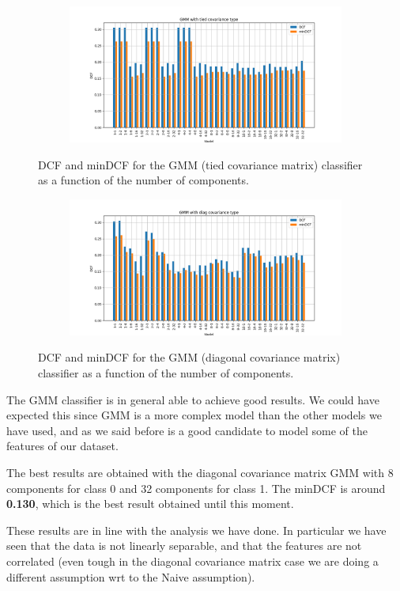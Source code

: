 \documentclass[12pt]{report}
\newcommand{\nnl}{%
    \newline
    \newline
}
\newcommand{\nl}{%
    \newline
    \noindent
}
\begin{document}
\begin{figure}[H]
    \centering
    \begin{subfigure}[t]{0.6\textwidth}
        \includegraphics[width=\textwidth]{./plot/GMM/gmm_tied.png}
    \end{subfigure}
    \caption{DCF and minDCF for the GMM (tied covariance matrix) classifier as a function of the number of components.}
    \label{fig:gmm_tied}
\end{figure}

\begin{figure}[H]
    \centering
    \begin{subfigure}[t]{0.6\textwidth}
        \includegraphics[width=\textwidth]{./plot/GMM/gmm_diag.png}
    \end{subfigure}
    \caption{DCF and minDCF for the GMM (diagonal covariance matrix) classifier as a function of the number of components.}
    \label{fig:gmm_diag}
\end{figure}
\noindent
The GMM classifier is in general able to achieve good results. We could have expected this since GMM is a more complex model than the other models we have used, and as we said before is a good candidate to model some of the features of our dataset.
\nnl
The best results are obtained with the diagonal covariance matrix GMM with 8 components for class 0 and 32 components for class 1. The minDCF is around \textbf{0.130}, which is the best result obtained until this moment.
\nl
These results are in line with the analysis we have done. In particular we have seen that the data is not linearly separable, and that the features are not correlated (even tough in the diagonal covariance matrix case we are doing a different assumption wrt to the Naive assumption).
\end{document}
